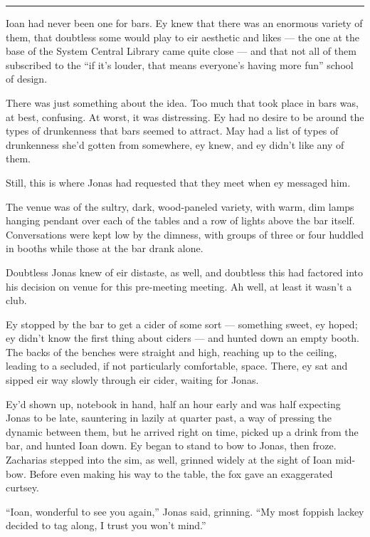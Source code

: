 \begin{center}\rule{0.5\linewidth}{0.5pt}\end{center}

Ioan had never been one for bars. Ey knew that there was an enormous variety of them, that doubtless some would play to eir aesthetic and likes — the one at the base of the System Central Library came quite close — and that not all of them subscribed to the ``if it's louder, that means everyone's having more fun'' school of design.

There was just something about the idea. Too much that took place in bars was, at best, confusing. At worst, it was distressing. Ey had no desire to be around the types of drunkenness that bars seemed to attract. May had a list of types of drunkenness she'd gotten from somewhere, ey knew, and ey didn't like any of them.

Still, this is where Jonas had requested that they meet when ey messaged him.

The venue was of the sultry, dark, wood-paneled variety, with warm, dim lamps hanging pendant over each of the tables and a row of lights above the bar itself. Conversations were kept low by the dimness, with groups of three or four huddled in booths while those at the bar drank alone.

Doubtless Jonas knew of eir distaste, as well, and doubtless this had factored into his decision on venue for this pre-meeting meeting. Ah well, at least it wasn't a club.

Ey stopped by the bar to get a cider of some sort — something sweet, ey hoped; ey didn't know the first thing about ciders — and hunted down an empty booth. The backs of the benches were straight and high, reaching up to the ceiling, leading to a secluded, if not particularly comfortable, space. There, ey sat and sipped eir way slowly through eir cider, waiting for Jonas.

Ey'd shown up, notebook in hand, half an hour early and was half expecting Jonas to be late, sauntering in lazily at quarter past, a way of pressing the dynamic between them, but he arrived right on time, picked up a drink from the bar, and hunted Ioan down. Ey began to stand to bow to Jonas, then froze. Zacharias stepped into the sim, as well, grinned widely at the sight of Ioan mid-bow. Before even making his way to the table, the fox gave an exaggerated curtsey.

``Ioan, wonderful to see you again,'' Jonas said, grinning. ``My most foppish lackey decided to tag along, I trust you won't mind.''


